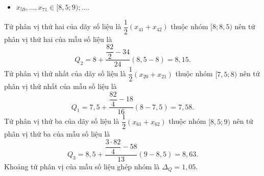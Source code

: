 \begin{ex}
{\begin{itemchoice}
\begin{itemize}
				\item $x_{59},  \ldots, x_{71} \in [8{,}5;9);\ldots$.
			\end{itemize}
			Tứ  phân vị thứ hai của dãy số liệu là $\dfrac{1}{2} \left(x_{41}+x_{42} \right)$ thuộc nhóm $[8;8{,}5)$ nên tứ phân vị thứ hai của mẫu số liệu là \[Q_2=8+\dfrac{\dfrac{82}{2}-34}{24} (8{,}5-8)=8{,}15.\]
			Tứ phân vị thứ nhất của dãy số liệu là $\dfrac{1}{2} \left(x_{20}+x_{21} \right)$ thuộc nhóm $[7{,}5;8)$ nên tứ phân vị thứ nhất của mẫu số liệu là \[Q_1=7{,}5+\dfrac{\dfrac{82}{4}-18}{16} (8-7{,}5)=7{,}58.\] 
			Tứ phân vị thứ ba của dãy số liệu là $\dfrac{1}{2} \left(x_{61}+x_{62} \right)$ thuộc nhóm $[8{,}5;9)$ nên tứ phân vị thứ ba của mẫu số liệu là \[Q_3=8{,}5+\dfrac{\dfrac{3\cdot 82}{4}-58}{13}  (9-8{,}5)=8{,}63.\]
			Khoảng tứ phân vị của mẫu số liệu ghép nhóm  là $\Delta_Q=1{,}05$.
		\end{itemchoice}
	} 
\end{ex}

